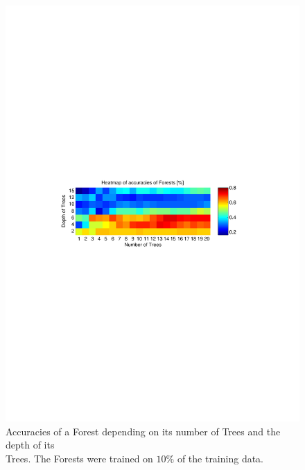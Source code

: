 \documentclass[twocolumn]{article}
\begin{document}
\begin{figure}[t] 
\centering
\includegraphics[angle=90]{Diagrams/Forests_Heatmap_Gini_15_20}
\caption{Accuracies of a Forest depending on its number of Trees and the depth of its\\\phantom{Figure 1: }Trees. The Forests were trained on $10\%$ of the training data.}
\label{forest_heatmap}
\end{figure}
\end{document}
